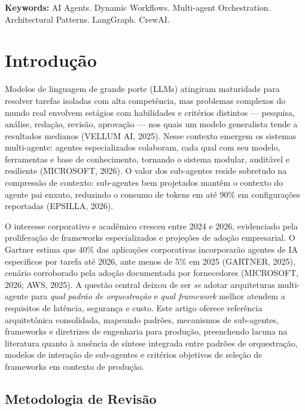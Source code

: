 \documentclass[12pt,a4paper]{article}
\begin{document}
\textbf{Keywords:} AI Agents. Dynamic Workflows. Multi-agent Orchestration. Architectural Patterns. LangGraph. CrewAI.


\section{Introdução}

Modelos de linguagem de grande porte (LLMs) atingiram maturidade para resolver tarefas isoladas com alta competência, mas problemas complexos do mundo real envolvem estágios com habilidades e critérios distintos — pesquisa, análise, redação, revisão, aprovação — nos quais um modelo generalista tende a resultados medianos (VELLUM AI, 2025). Nesse contexto emergem os sistemas multi-agente: agentes especializados colaboram, cada qual com seu modelo, ferramentas e base de conhecimento, tornando o sistema modular, auditável e resiliente (MICROSOFT, 2026). O valor dos sub-agentes reside sobretudo na compressão de contexto: sub-agentes bem projetados mantêm o contexto do agente pai enxuto, reduzindo o consumo de tokens em até 90\% em configurações reportadas (EPSILLA, 2026).

O interesse corporativo e acadêmico cresceu entre 2024 e 2026, evidenciado pela proliferação de frameworks especializados e projeções de adoção empresarial. O Gartner estima que 40\% das aplicações corporativas incorporarão agentes de IA específicos por tarefa até 2026, ante menos de 5\% em 2025 (GARTNER, 2025), cenário corroborado pela adoção documentada por fornecedores (MICROSOFT, 2026; AWS, 2025). A questão central deixou de ser \textit{se} adotar arquiteturas multi-agente para \textit{qual padrão de orquestração} e \textit{qual framework} melhor atendem a requisitos de latência, segurança e custo. Este artigo oferece referência arquitetônica consolidada, mapeando padrões, mecanismos de sub-agentes, frameworks e diretrizes de engenharia para produção, preenchendo lacuna na literatura quanto à ausência de síntese integrada entre padrões de orquestração, modelos de interação de sub-agentes e critérios objetivos de seleção de frameworks em contexto de produção.

\subsection{Metodologia de Revisão}
\end{document}

